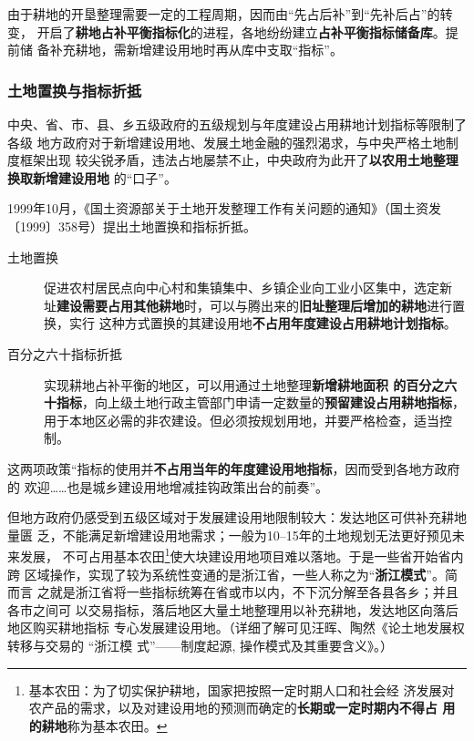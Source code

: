 由于耕地的开垦整理需要一定的工程周期，因而由“先占后补”到“先补后占”的转变，
开启了\textbf{耕地占补平衡指标化}的进程，各地纷纷建立\textbf{占补平衡指标储备库}。提前储
备补充耕地，需新增建设用地时再从库中支取“指标”。



\subsubsection{土地置换与指标折抵}

中央、省、市、县、乡五级政府的五级规划与年度建设占用耕地计划指标等限制了各级
地方政府对于新增建设用地、发展土地金融的强烈渴求，与中央严格土地制度框架出现
较尖锐矛盾，违法占地屡禁不止，中央政府为此开了\textbf{以农用土地整理换取新增建设用地}
的“口子”。

1999年10月，《国土资源部关于土地开发整理工作有关问题的通知》（国土资发
〔1999〕358号）提出土地置换和指标折抵。

\begin{description}
\item[土地置换] 促进农村居民点向中心村和集镇集中、乡镇企业向工业小区集中，选定新
  址\textbf{建设需要占用其他耕地}时，可以与腾出来的\textbf{旧址整理后增加的耕地}进行置换，实行
  这种方式置换的其建设用地\textbf{不占用年度建设占用耕地计划指标}。


\item[百分之六十指标折抵] 实现耕地占补平衡的地区，可以用通过土地整理\textbf{新增耕地面积
  的百分之六十指标}，向上级土地行政主管部门申请一定数量的\textbf{预留建设占用耕地指标}，
  用于本地区必需的非农建设。但必须按规划用地，并要严格检查，适当控制。
\end{description}

这两项政策“指标的使用并\textbf{不占用当年的年度建设用地指标}，因而受到各地方政府的
欢迎……也是城乡建设用地增减挂钩政策出台的前奏”。

但地方政府仍感受到五级区域对于发展建设用地限制较大：发达地区可供补充耕地量匮
乏，不能满足新增建设用地需求；一般为10--15年的土地规划无法更好预见未来发展，
不可占用基本农田\footnote{基本农田：为了切实保护耕地，国家把按照一定时期人口和社会经
  济发展对农产品的需求，以及对建设用地的预测而确定的\textbf{长期或一定时期内不得占
    用的耕地}称为基本农田。}使大块建设用地项目难以落地。于是一些省开始省内跨
区域操作，实现了较为系统性变通的是浙江省，一些人称之为“\textbf{浙江模式}”。简而言
之就是浙江省将一些指标统筹在省或市以内，不下沉分解至各县各乡；并且各市之间可
以交易指标，落后地区大量土地整理用以补充耕地，发达地区向落后地区购买耕地指标
专心发展建设用地。（详细了解可见汪晖、陶然《论土地发展权转移与交易的 “浙江模
式”——制度起源, 操作模式及其重要含义》。）


